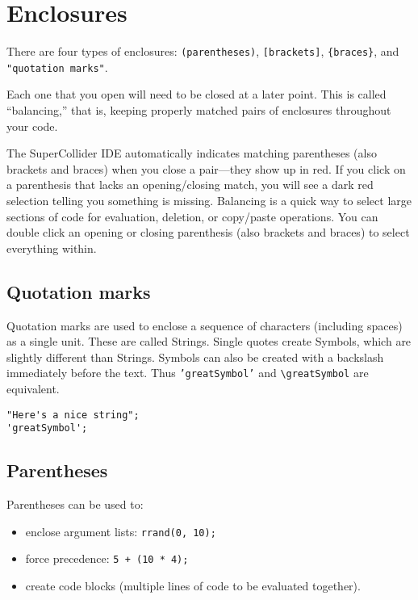 \section{Enclosures}

There are four types of enclosures: \texttt{(parentheses)}, \texttt{[brackets]}, \texttt{\{braces\}}, and \texttt{"quotation marks"}.

Each one that you open will need to be closed at a later point. This is called ``balancing,'' that is, keeping properly matched pairs of enclosures throughout your code.

The SuperCollider IDE automatically indicates matching parentheses (also brackets and braces) when you close a pair---they show up in red. If you click on a parenthesis that lacks an opening/closing match, you will see a dark red selection telling you something is missing. Balancing is a quick way to select large sections of code for evaluation, deletion, or copy/paste operations. You can double click an opening or closing parenthesis (also brackets and braces) to select everything within.

\subsection{Quotation marks}

Quotation marks are used to enclose a sequence of characters (including spaces) as a single unit. These are called Strings. Single quotes create Symbols, which are slightly different than Strings. Symbols can also be created with a backslash immediately before the text. Thus \texttt{'greatSymbol'} and \texttt{\textbackslash greatSymbol} are equivalent.

\begin{lstlisting}[style=SuperCollider-IDE, basicstyle=\scttfamily\footnotesize]
"Here's a nice string";
'greatSymbol';
\end{lstlisting}

\subsection{Parentheses}

Parentheses can be used to:

\begin{itemize}
\item enclose argument lists: \texttt{rrand(0, 10);}
\item force precedence: \texttt{5 + (10 * 4);}
\item create code blocks (multiple lines of code to be evaluated together).
\end{itemize} 

